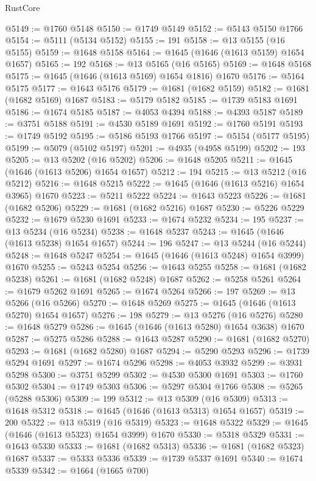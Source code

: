 \begin{lexlean}{RustCore}
\begin{coremodule}
@5149 := @1760 @5148
@5150 := @1749 @5149
@5152 := @5143 @5150 @1766
@5154 := @5111 (@5134 @5152)
@5155 := 191
@5158 := @13 @5155 (@16 @5155)
@5159 := @1648 @5158
@5164 := @1645 (@1646 (@1613 @5159) @1654 @1657)
@5165 := 192
@5168 := @13 @5165 (@16 @5165)
@5169 := @1648 @5168
@5175 := @1645 (@1646 (@1613 @5169) @1654 @1816) @1670
@5176 := @5164 @5175
@5177 := @1643 @5176
@5179 := @1681 (@1682 @5159)
@5182 := @1681 (@1682 @5169) @1687
@5183 := @5179 @5182
@5185 := @1739 @5183 @1691
@5186 := @1674 @5185
@5187 := @4053 @4394
@5188 := @4393 @5187
@5189 := @3751 @5188
@5191 := @4530 @5189 @1691
@5192 := @1760 @5191
@5193 := @1749 @5192
@5195 := @5186 @5193 @1766
@5197 := @5154 (@5177 @5195)
@5199 := @5079 (@5102 @5197)
@5201 := @4935 (@4958 @5199)
@5202 := 193
@5205 := @13 @5202 (@16 @5202)
@5206 := @1648 @5205
@5211 := @1645 (@1646 (@1613 @5206) @1654 @1657)
@5212 := 194
@5215 := @13 @5212 (@16 @5212)
@5216 := @1648 @5215
@5222 := @1645 (@1646 (@1613 @5216) @1654 @3965) @1670
@5223 := @5211 @5222
@5224 := @1643 @5223
@5226 := @1681 (@1682 @5206)
@5229 := @1681 (@1682 @5216) @1687
@5230 := @5226 @5229
@5232 := @1679 @5230 @1691
@5233 := @1674 @5232
@5234 := 195
@5237 := @13 @5234 (@16 @5234)
@5238 := @1648 @5237
@5243 := @1645 (@1646 (@1613 @5238) @1654 @1657)
@5244 := 196
@5247 := @13 @5244 (@16 @5244)
@5248 := @1648 @5247
@5254 := @1645 (@1646 (@1613 @5248) @1654 @3999) @1670
@5255 := @5243 @5254
@5256 := @1643 @5255
@5258 := @1681 (@1682 @5238)
@5261 := @1681 (@1682 @5248) @1687
@5262 := @5258 @5261
@5264 := @1679 @5262 @1691
@5265 := @1674 @5264
@5266 := 197
@5269 := @13 @5266 (@16 @5266)
@5270 := @1648 @5269
@5275 := @1645 (@1646 (@1613 @5270) @1654 @1657)
@5276 := 198
@5279 := @13 @5276 (@16 @5276)
@5280 := @1648 @5279
@5286 := @1645 (@1646 (@1613 @5280) @1654 @3638) @1670
@5287 := @5275 @5286
@5288 := @1643 @5287
@5290 := @1681 (@1682 @5270)
@5293 := @1681 (@1682 @5280) @1687
@5294 := @5290 @5293
@5296 := @1739 @5294 @1691
@5297 := @1674 @5296
@5298 := @4053 @3932
@5299 := @3931 @5298
@5300 := @3751 @5299
@5302 := @4530 @5300 @1691
@5303 := @1760 @5302
@5304 := @1749 @5303
@5306 := @5297 @5304 @1766
@5308 := @5265 (@5288 @5306)
@5309 := 199
@5312 := @13 @5309 (@16 @5309)
@5313 := @1648 @5312
@5318 := @1645 (@1646 (@1613 @5313) @1654 @1657)
@5319 := 200
@5322 := @13 @5319 (@16 @5319)
@5323 := @1648 @5322
@5329 := @1645 (@1646 (@1613 @5323) @1654 @3999) @1670
@5330 := @5318 @5329
@5331 := @1643 @5330
@5333 := @1681 (@1682 @5313)
@5336 := @1681 (@1682 @5323) @1687
@5337 := @5333 @5336
@5339 := @1739 @5337 @1691
@5340 := @1674 @5339
@5342 := @1664 (@1665 @700)

\end{coremodule}
\end{lexlean}
